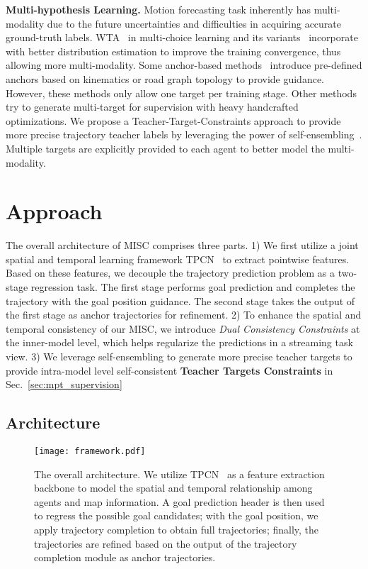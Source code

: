 \documentclass[10pt,twocolumn,letterpaper]{article}
\begin{document}
\noindent\textbf{Multi-hypothesis Learning.} Motion forecasting task inherently has multi-modality due to the future uncertainties and difficulties in acquiring accurate ground-truth labels. WTA~\cite{guzman2012multiple,sriram2019hierarchical} in multi-choice learning and its variants~\cite{makansi2019overcoming,rupprecht2017learning} incorporate with better distribution estimation to improve the training convergence, thus allowing more multi-modality. Some anchor-based methods~\cite{breuer2021quo,chai2019multipath,phan2020covernet,zeng2021lanercnn} introduce pre-defined anchors based on kinematics or road graph topology to provide guidance. However, these methods only allow one target per training stage. Other methods~\cite{breuer2021quo,gu2021densetnt} try to generate multi-target for supervision with heavy handcrafted optimizations. We propose a Teacher-Target-Constraints approach to provide more precise trajectory teacher labels by leveraging the power of self-ensembling~\cite{lee2013pseudo,zheng2021se}. Multiple targets are explicitly provided to each agent to better model the multi-modality.


\section{Approach}
The overall architecture of MISC comprises three parts. 1) We first utilize a joint spatial and temporal learning framework TPCN~\cite{ye2021tpcn} to extract pointwise features. Based on these features, we decouple the trajectory prediction problem as a two-stage regression task. The first stage performs goal prediction and completes the trajectory with the goal position guidance. The second stage takes the output of the first stage as anchor trajectories for refinement. 2) To enhance the spatial and temporal consistency of our MISC, we introduce \emph{Dual Consistency Constraints} at the inner-model level, which helps regularize the predictions in a streaming task view.
3) We leverage self-ensembling to generate more precise teacher targets to provide intra-model level self-consistent \textbf{Teacher Targets Constraints} in Sec.~\ref{sec:mpt_supervision}

\subsection{Architecture}
\label{sec:architecture}
\begin{figure*}
    \centering
    \texttt{[image: framework.pdf]}
\caption{The overall architecture. We utilize TPCN~\cite{ye2021tpcn} as a feature extraction backbone to model the spatial and temporal relationship among agents and map information. A goal prediction header is then used to regress the possible goal candidates; with the goal position, we apply trajectory completion to obtain full trajectories; finally, the trajectories are refined based on the output of the trajectory completion module as anchor trajectories.}
    \label{fig:network}
\end{figure*}
\end{document}
